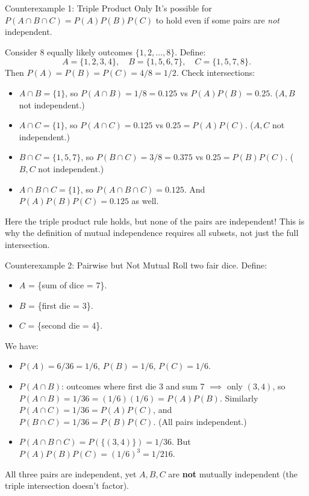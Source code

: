 \documentclass[aspectratio=169,11pt]{beamer} %
\begin{document}
\begin{frame}{Counterexample 1: Triple Product Only}
It's possible for $P(A \cap B \cap C) = P(A)P(B)P(C)$ to hold even if some pairs are \emph{not} independent. \newline

Consider 8 equally likely outcomes $\{1,2,\dots,8\}$. Define:
\[ A = \{1,2,3,4\}, \quad B = \{1,5,6,7\}, \quad C = \{1,5,7,8\}. \]
Then $P(A)=P(B)=P(C)=4/8=1/2$. Check intersections:
\begin{itemize}
    \item $A \cap B = \{1\}$, so $P(A \cap B)=1/8=0.125$ vs $P(A)P(B)=0.25$. ($A, B$ not independent.)
    \item $A \cap C = \{1\}$, so $P(A \cap C)=0.125$ vs $0.25 = P(A)P(C)$. ($A, C$ not independent.)
    \item $B \cap C = \{1,5,7\}$, so $P(B \cap C)=3/8=0.375$ vs $0.25 = P(B)P(C)$. ($B, C$ not independent.)
    \item $A \cap B \cap C = \{1\}$, so $P(A \cap B \cap C) = 0.125$. And $P(A)P(B)P(C) = 0.125$ as well.
\end{itemize}
Here the triple product rule holds, but none of the pairs are independent! This is why the definition of mutual independence requires all subsets, not just the full intersection.
\end{frame}

\begin{frame}{Counterexample 2: Pairwise but Not Mutual}
Roll two fair dice. Define:
\begin{itemize}
    \item $A$ = \{sum of dice = 7\}.
    \item $B$ = \{first die = 3\}.
    \item $C$ = \{second die = 4\}.
\end{itemize}
We have:
\begin{itemize}
    \item $P(A) = 6/36 = 1/6$, $P(B) = 1/6$, $P(C) = 1/6$. 
    \item $P(A \cap B)$: outcomes where first die 3 and sum 7 $\implies$ only $(3,4)$, so $P(A \cap B) = 1/36 = (1/6)(1/6) = P(A)P(B)$. Similarly $P(A \cap C) = 1/36 = P(A)P(C)$, and $P(B \cap C) = 1/36 = P(B)P(C)$. (All pairs independent.)
    \item $P(A \cap B \cap C) = P(\{(3,4)\}) = 1/36$. But $P(A)P(B)P(C) = (1/6)^3 = 1/216$. 
\end{itemize}
All three pairs are independent, yet $A, B, C$ are \textbf{not} mutually independent (the triple intersection doesn't factor).
\end{frame}
\end{document}

